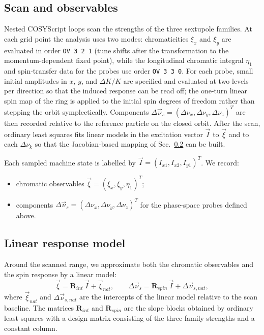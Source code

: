 \documentclass[%
               ]{jacow}
\begin{document}
\subsection{Scan and observables}
\par Nested COSYScript loops scan the strengths of the three sextupole families. At each grid point the analysis uses two modes: chromaticities \(\xi_x\) and \(\xi_y\) are evaluated in order \texttt{OV 3 2 1} (tune shifts after the transformation to the momentum-dependent fixed point), while the longitudinal chromatic integral \(\eta_1\) and spin-transfer data for the probes use order \texttt{OV 3 3 0}. For each probe, small initial amplitudes in \(x\), \(y\), and \(\Delta K/K\) are specified and evaluated at two levels per direction so that the induced response can be read off; the one-turn linear spin map of the ring is applied to the initial spin degrees of freedom rather than stepping the orbit symplectically. Components \(\Delta\vec\nu_s=(\Delta\nu_x,\Delta\nu_y,\Delta\nu_z)^T\) are then recorded relative to the reference particle on the closed orbit. After the scan, ordinary least squares fits linear models in the excitation vector \(\vec I\) to \(\vec\xi\) and to each \(\Delta\nu_k\) so that the Jacobian-based mapping of Sec.~\ref{subsec:linresp} can be built.
\par Each sampled machine state is labelled by \(\vec I=(I_{x1},I_{x2},I_{y1})^T\). We record:
\begin{itemize}
	\item chromatic observables \(\vec\xi = (\xi_x,\xi_y,\eta_1)^T\);
	\item components \(\Delta\vec\nu_s=(\Delta\nu_x,\Delta\nu_y,\Delta\nu_z)^T\) for the phase-space probes defined above.
\end{itemize}

\subsection{Linear response model}
\label{subsec:linresp}
\par Around the scanned range, we approximate both the chromatic observables and the spin response by a linear model:
\begin{equation}
	\vec\xi = \mathbf{R}_{int}\,\vec I + \vec\xi_{nat},\qquad
	\Delta\vec\nu_s = \mathbf{R}_{spin}\,\vec I + \Delta\vec\nu_{s,nat},
	\label{eq:lin_model}
\end{equation}
\noindent where \(\vec\xi_{nat}\) and \(\Delta\vec\nu_{s,nat}\) are the intercepts of the linear model relative to the scan baseline. The matrices \(\mathbf{R}_{int}\) and \(\mathbf{R}_{spin}\) are the slope blocks obtained by ordinary least squares with a design matrix consisting of the three family strengths and a constant column.
\end{document}
